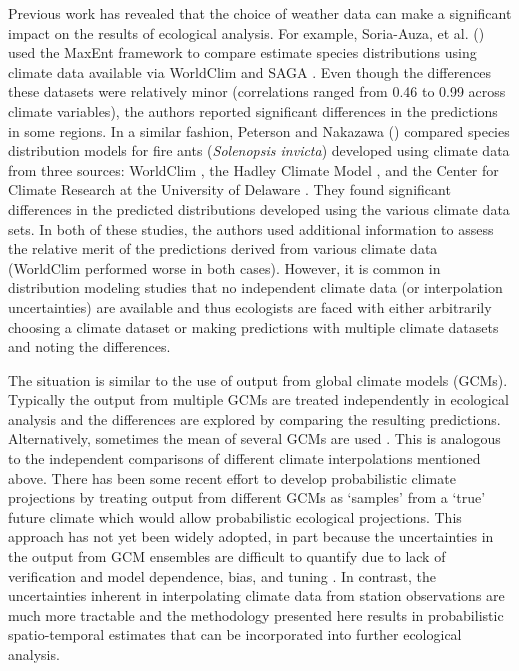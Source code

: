 \documentclass[12pt]{article}
\begin{document}
Previous work has revealed that the choice of weather data can make a
significant impact on the results of ecological analysis.  For
example, Soria-Auza, et
al. (\citeyear{soria-auza_impact_2010}) used the MaxEnt framework
\citep{elith_statistical_2011} to compare estimate species
distributions using climate data available via WorldClim \citep{hijmans_very_2005} and SAGA
\citep{bohner_advancements_2005}.  
Even though the differences these datasets were relatively minor
(correlations ranged from 0.46 to 0.99 across climate variables), the
authors reported significant differences in the predictions in some regions.  
In a similar fashion, Peterson and Nakazawa
(\citeyear{peterson_environmental_2008}) compared species distribution
models for fire ants (\textit{Solenopsis invicta}) developed using climate data from three sources: WorldClim
\citep{hijmans_very_2005}, the Hadley Climate Model \citep{johns_second_1997}, and the Center for Climate Research at the
University of Delaware \citep{feddema_revised_2005}.  
They found significant differences in the predicted distributions
developed using the various climate data sets.  
In both of these studies, the authors used additional information to assess the
relative merit of the predictions derived from various climate data
(WorldClim performed worse in both cases).  
However, it is common in distribution modeling studies that no
independent climate data (or interpolation uncertainties) are available and thus
ecologists are faced with either arbitrarily choosing a climate
dataset or making predictions with multiple climate datasets and
noting the differences.  

The situation is similar to the use of output from global climate models
(GCMs).  
Typically the output from multiple GCMs are treated independently in ecological analysis \citep[e.g.][]{beaumont_why_2008,lawler_projected_2009} and the
differences are explored by comparing the resulting predictions.
Alternatively, sometimes the mean of several GCMs are used \citep{ahmed_bias_2013}. 
This is  analogous to the independent comparisons of different climate interpolations
mentioned above.  
There has been some recent effort to develop probabilistic climate
projections by treating output from different GCMs as `samples'
from a `true' future climate \citep{tebaldi_use_2007} which would
allow probabilistic ecological projections.  
This approach has not yet been widely adopted, in part because the
uncertainties in the output  from GCM ensembles are
difficult to quantify due to lack of verification and model
dependence, bias, and tuning  \citep{tebaldi_use_2007}. 
In contrast, the uncertainties inherent in interpolating climate data from station
observations are much more tractable and the methodology presented
here results in probabilistic spatio-temporal estimates that can be
incorporated into further ecological analysis.  
\end{document}
